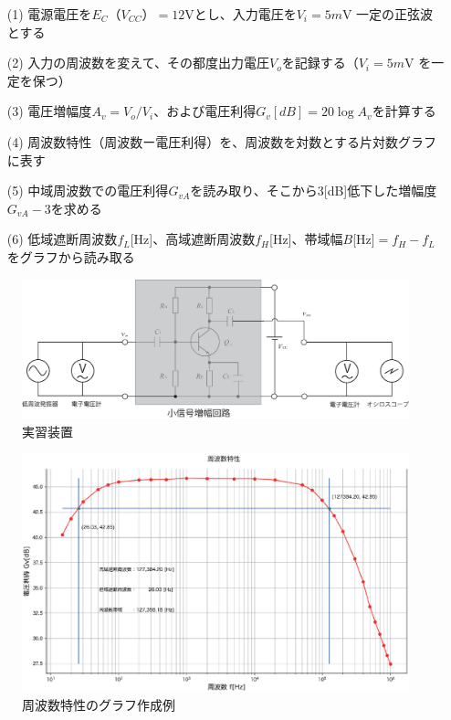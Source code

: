 \documentclass[uplatex,a4paper,11pt,oneside,openany]{jsbook}
\begin{document}
\begin{enumerate}
\item[(1)] 電源電圧を$E_C（V_{CC}）=12$Vとし、入力電圧を$V_i=5m$V 一定の正弦波とする
\item[(2)] 入力の周波数を変えて、その都度出力電圧$V_o$を記録する（$V_i=5m$V を一定を保つ）
\item[(3)] 電圧増幅度$A_v=V_o/V_i$、および電圧利得$G_v[dB]=20\log A_v$を計算する
\item[(4)] 周波数特性（周波数ー電圧利得）を、周波数を対数とする片対数グラフに表す
\item[(5)] 中域周波数での電圧利得$G_{vA}$を読み取り、そこから3[dB]低下した増幅度$G_{vA}-3$を求める
\item[(6)] 低域遮断周波数$f_L$[Hz]、高域遮断周波数$f_H$[Hz]、帯域幅$B$[Hz]$=f_H-f_L$をグラフから読み取る
\end{enumerate}

\begin{figure}[H]
  \centering
   \includegraphics[keepaspectratio, scale=0.48, angle=0]
             {figs/eps/exp0.eps}
             \caption{実習装置}
             \label{fig:exp0}
\end{figure}


\begin{figure}[H]
    \centering
     \includegraphics[keepaspectratio, scale=0.55, angle=0]
               {figs/eps/freqcharM1YExample.eps}
               \caption{周波数特性のグラフ作成例}
               \label{fig:freqcharM1Yd}
\end{figure}
\end{document}
